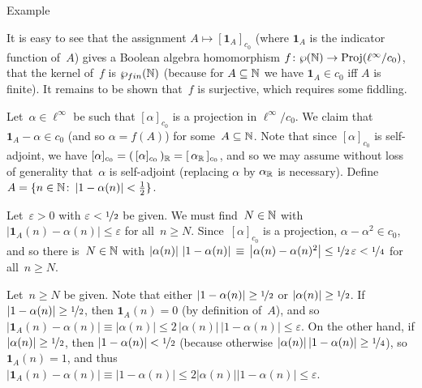 \documentclass[a]{subfiles}
\begin{document}
\begin{parsec}
\begin{point}{Example}
\begin{point}
It is easy to see that the assignment $A\mapsto [\mathbf{1}_A]_{c_0}$
(where $\mathbf{1}_A$ is the indicator function of~$A$)
gives a Boolean algebra homomorphism 
$f\colon \wp(\mathbb{N})\to \operatorname{Proj}(\ell^\infty/c_0)$,
that the kernel of~$f$
is $\wp_{fin}(\mathbb{N})$
(because for $A\subseteq \mathbb{N}$
we have $\mathbf{1}_A\in c_0$ iff $A$ is finite).
It remains to be shown that~$f$ is surjective,
which requires some fiddling.

Let~$\alpha\in \ell^\infty$
be
such that $[\alpha]_{c_0}$ is a projection in $\ell^\infty/c_0$.
We claim that
$\mathbf{1}_A - \alpha \in c_0$ (and so $\alpha=f(A)$)
for some~$A\subseteq \mathbb{N}$.
Note that since $[\alpha]_{c_0}$ is self-adjoint,
we have $[\alpha]_{c_0}=(\,[\alpha]_{c_0}\,)_{\mathbb{R}} = [\,\alpha_{\mathbb{R}}\,]_{c_0}$,
and so we may assume without loss of generality
that~$\alpha$ is self-adjoint
(replacing $\alpha$ by $\alpha_{\mathbb{R}}$ is necessary).
Define $A=\{n\in\mathbb{N}\colon \left|1-\alpha(n)\right|<\frac{1}{2}\}$.

Let~$\varepsilon>0$ with $\varepsilon<\nicefrac{1}{2}$ be given.
We must find~$N\in\mathbb{N}$ with 
$\left| \mathbf{1}_A(n)-\alpha(n)\right|\leq \varepsilon$
for all~$n\geq N$.
Since~$[\alpha]_{c_0}$ is a projection,
$\alpha-\alpha^2\in c_0$,
and so
there is~$N\in \mathbb{N}$
with $\left|\alpha(n)\right| \,\left| 1-\alpha(n)\right|
\,\equiv\, \left| \alpha(n) - \alpha(n)^2 \right| \leq 
\nicefrac{1}{2}\,\varepsilon < \nicefrac{1}{4}$
for all~$n\geq N$.

Let~$n\geq N$ be given.
Note that either 
$\left|1-\alpha(n)\right|\geq \nicefrac{1}{2}$
or 
$\left|\alpha(n)\right|\geq \nicefrac{1}{2}$.
If~$\left|1-\alpha(n)\right|\geq\nicefrac{1}{2}$,
then $\mathbf{1}_A(n)=0$
(by definition of~$A$),
and so $\left|\mathbf{1}_A(n)-\alpha(n)\right|\equiv \left|\alpha(n)\right| 
\leq 2 \,\left|\alpha(n)\right|\,\left| 1-\alpha(n)\right|
\leq \varepsilon$.
On the other hand,
if  $\left|\alpha(n)\right| \geq \nicefrac{1}{2}$,
then $\left|1-\alpha(n)\right| < \nicefrac{1}{2}$
(because otherwise $\left|\alpha(n)\right|\left|1-\alpha(n)\right|
\geq \nicefrac{1}{4}$),
so $\mathbf{1}_A(n)=1$,
and thus
$\left|\mathbf{1}_A(n)-\alpha(n)\right|
\equiv \left|1-\alpha(n)\right|
\leq 2 \left|\alpha(n)\right|\left|1-\alpha(n)\right|
\leq \varepsilon$.


\end{point}
\end{point}
\end{parsec}
\end{document}
